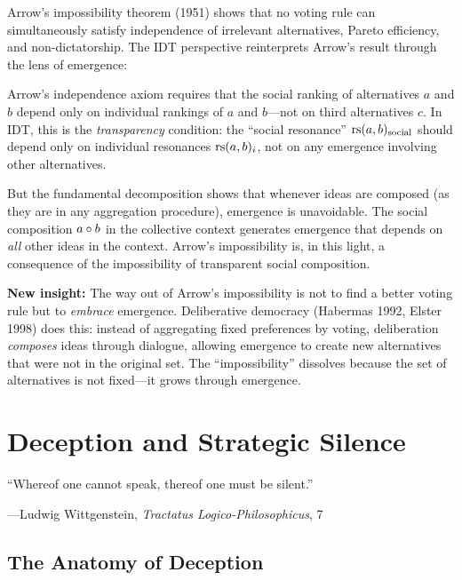 \begin{interpretation}
Arrow's impossibility theorem (1951) shows that no voting rule can
simultaneously satisfy independence of irrelevant alternatives,
Pareto efficiency, and non-dictatorship. The IDT perspective
reinterprets Arrow's result through the lens of emergence:

Arrow's independence axiom requires that the social ranking of
alternatives $a$ and $b$ depend only on individual rankings of
$a$ and $b$---not on third alternatives $c$. In IDT, this is the
\emph{transparency} condition: the ``social resonance''
$\mathrm{rs}(a, b)_{\text{social}}$ should depend only on individual
resonances $\mathrm{rs}(a, b)_i$, not on any emergence involving other
alternatives.

But the fundamental decomposition shows that whenever ideas are
composed (as they are in any aggregation procedure), emergence is
unavoidable. The social composition $a \circ b$ in the collective
context generates emergence that depends on \emph{all} other ideas
in the context. Arrow's impossibility is, in this light, a consequence
of the impossibility of transparent social composition.

\textbf{New insight:} The way out of Arrow's impossibility is not to
find a better voting rule but to \emph{embrace} emergence. Deliberative
democracy (Habermas 1992, Elster 1998) does this: instead of aggregating
fixed preferences by voting, deliberation \emph{composes} ideas
through dialogue, allowing emergence to create new alternatives that
were not in the original set. The ``impossibility'' dissolves because
the set of alternatives is not fixed---it grows through emergence.
\end{interpretation}



\chapter{Deception and Strategic Silence}
\label{ch:deception}

\epigraph{``Whereof one cannot speak, thereof one must be silent.''}
{---Ludwig Wittgenstein, \emph{Tractatus Logico-Philosophicus}, 7}


\section{The Anatomy of Deception}

